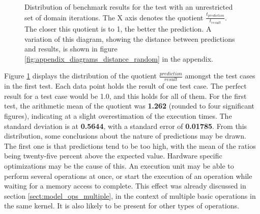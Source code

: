 \begin{figure}[h]
    \begin{center}
    \end{center}
    \caption{Distribution of benchmark results for the test with an unrestricted set of domain iterations. The X axis denotes the quotient $\frac{t_{prediction}}{t_{result}}$. The closer this quotient is to 1, the better the prediction. A variation of this diagram, showing the distance between predictions and results, is shown in figure \ref{fig:appendix_diagrams_distance_random} in the appendix.}
    \label{fig:results_evaluation_unrestricted_hist}
\end{figure}

Figure \ref{fig:results_evaluation_unrestricted_hist} displays the distribution of the quotient $\frac{prediction}{result}$ amongst the test cases in the first test. Each data point holds the result of one test case. The perfect result for a test case would be 1.0, and this holds for all of them. For the first test, the arithmetic mean of the quotient was \textbf{1.262} (rounded to four significant figures), indicating at a slight overestimation of the execution times. The standard deviation is at \textbf{0.5644}, with a standard error of \textbf{0.01785}. From this distribution, some conclusions about the nature of predictions may be drawn.\\

The first one is that predictions tend to be too high, with the mean of the ratios being twenty-five percent above the expected value. Hardware specific optimizations may be the cause of this. An execution unit may be able to perform several operations at once, or start the execution of an operation while waiting for a memory access to complete. This effect was already discussed in section \ref{sect:model_ops_multiple}, in the context of multiple basic operations in the same kernel. It is also likely to be present for other types of operations. \\


